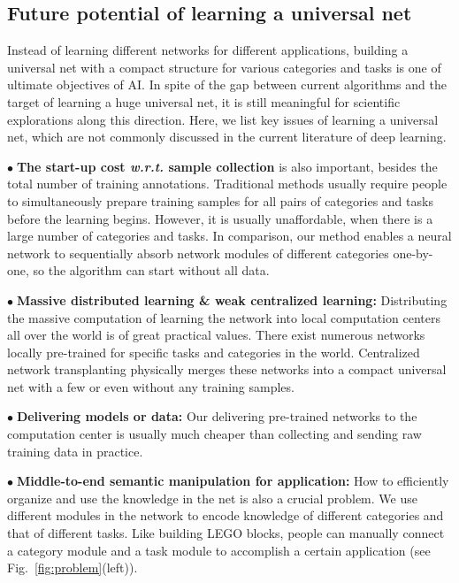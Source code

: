 \documentclass[10pt,twocolumn,letterpaper]{article}
\begin{document}
\subsection{Future potential of learning a universal net}
\label{sec:universal}

Instead of learning different networks for different applications, building a universal net with a compact structure for various categories and tasks is one of ultimate objectives of AI. In spite of the gap between current algorithms and the target of learning a huge universal net, it is still meaningful for scientific explorations along this direction. Here, we list key issues of learning a universal net, which are not commonly discussed in the current literature of deep learning.

\noindent
$\bullet\;$\textbf{The start-up cost \emph{w.r.t.} sample collection} is also important, besides the total number of training annotations. Traditional methods usually require people to simultaneously prepare training samples for all pairs of categories and tasks before the learning begins. However, it is usually unaffordable, when there is a large number of categories and tasks. In comparison, our method enables a neural network to sequentially absorb network modules of different categories one-by-one, so the algorithm can start without all data.

\noindent
$\bullet\;$\textbf{Massive distributed learning \& weak centralized learning:} Distributing the massive computation of learning the network into local computation centers all over the world is of great practical values. There exist numerous networks locally pre-trained for specific tasks and categories in the world. Centralized network transplanting physically merges these networks into a compact universal net with a few or even without any training samples.

\noindent
$\bullet\;$\textbf{Delivering models or data:} Our delivering pre-trained networks to the computation center is usually much cheaper than collecting and sending raw training data in practice.

\noindent
$\bullet\;$\textbf{Middle-to-end semantic manipulation for application:} How to efficiently organize and use the knowledge in the net is also a crucial problem. We use different modules in the network to encode knowledge of different categories and that of different tasks. Like building LEGO blocks, people can manually connect a category module and a task module to accomplish a certain application (see Fig.~\ref{fig:problem}(left)).
\end{document}
